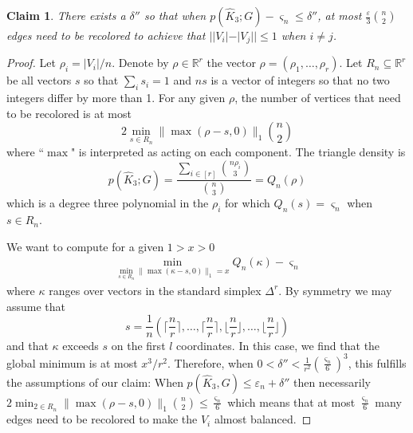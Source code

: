\documentclass[a4paper,11pt]{article}
\newtheorem{claim}[theorem]{Claim}
\numberwithin{equation}{section}
\begin{document}
\begin{claim}\label{claim:f6}
    There exists a $\delta''$ so that when $p(\hat K_3;G)-\varsigma_n\le \delta''$, at most
    $\frac{\varepsilon}{3}\binom{n}{2}$ edges need to be recolored to achieve that $||V_i|-|V_j||\le 1$ when $i\ne j$.
\end{claim}
\begin{proof}
Let $\rho_i = |V_i|/n$. Denote by $\rho\in \mathbb R^r$ the vector $\rho=(\rho_1,\dots,\rho_r)$. Let $R_n\subseteq\mathbb R^r$ be all vectors $s$ so that $\sum_i s_i=1$ and $ns$ is a vector of integers so that no two integers differ by more than 1.
For any given $\rho$, the number of vertices that need to be recolored is at most
\begin{equation}\label{eq:dist_to_optimimum}
    2\min_{s\in R_n} \|\max(\rho-s,0)\|_1\binom{n}{2}
\end{equation}
where “$\max$" is interpreted as acting on each component. 
The triangle density is
    \begin{equation*}
        p(\hat K_3;G) = \frac{
        \sum_{i\in [r]}\binom{n\rho_i}{3}}{\binom{n}{3}}
        =
        Q_n(\rho)
    \end{equation*}
    which is a degree three polynomial in the $\rho_i$ for which $Q_n(s)=\varsigma_n$ when $s\in R_n$. 

We want to compute for a given $1>x>0$
\begin{align*}
    \min_{\min_{s\in R_n}\|\max(\kappa-s,0)\|_1=x} Q_n(\kappa)-\varsigma_n
\end{align*}
where $\kappa$ ranges over vectors in the standard simplex $\Delta^r$. By symmetry we may assume that 
\[
    s = \frac{1}{n}\left(\lceil \frac{n}{r}\rceil, \dots, \lceil \frac{n}{r}\rceil, \lfloor \frac{n}{r}\rfloor, \dots, \lfloor \frac{n}{r}\rfloor\right)
\]
and that $\kappa$ exceeds $s$ on the first $l$ coordinates. 
In this case, we find that the global minimum is at most $x^3/r^2$.
Therefore, when $0<\delta'' < \frac{1}{r^2}\left(\frac{\varsigma_n}{6}\right)^3$, this fulfills the assumptions of our claim: When $p(\hat K_3,G)\le \varepsilon_n+\delta''$ then necessarily $2\min_{2\in R_n}\|\max(\rho-s,0) \|_1\binom{n}{2}\le \frac{\varsigma_n}{6}$ which means that at most $\frac{\varsigma_n}{6}$ many edges need to be recolored to make the $V_i$ almost balanced. 
\end{proof}
\end{document}
